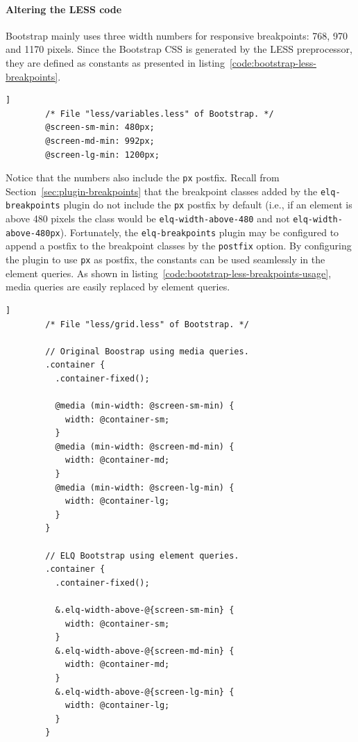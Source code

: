 \documentclass[a4paper,11pt]{kth-mag}
\newcommand{\code}[1]{\texttt{#1}}
\begin{document}
      \paragraph{Altering the LESS code}
      Bootstrap mainly uses three width numbers for responsive breakpoints: 768, 970 and 1170 pixels.
      Since the Bootstrap \gls{CSS} is generated by the \gls{LESS} preprocessor, they are defined as constants as presented in listing~\ref{code:bootstrap-less-breakpoints}.
      \begin{lstlisting}[gobble=8,label={code:bootstrap-less-breakpoints},caption={The main breakpoints used by Bootstrap defined as \gls{LESS} constants.},captionpos=b]]
        /* File "less/variables.less" of Bootstrap. */
        @screen-sm-min: 480px;
        @screen-md-min: 992px;
        @screen-lg-min: 1200px;
      \end{lstlisting}
      Notice that the numbers also include the \code{px} postfix.
      Recall from Section~\ref{sec:plugin-breakpoints} that the breakpoint classes added by the \code{elq-breakpoints} plugin do not include the \code{px} postfix by default (i.e., if an element is above 480 pixels the class would be \code{elq-width-above-480} and not \code{elq-width-above-480px}).
      Fortunately, the \code{elq-breakpoints} plugin may be configured to append a postfix to the breakpoint classes by the \code{postfix} option.
      By configuring the plugin to use \code{px} as postfix, the constants can be used seamlessly in the element queries.
      As shown in listing~\ref{code:bootstrap-less-breakpoints-usage}, media queries are easily replaced by element queries.
      \begin{lstlisting}[gobble=8,label={code:bootstrap-less-breakpoints-usage},caption={Media queries can easily be replaced with element queries. By using the \code{elq-breakpoints} postfix option, the breakpoint constants can be used directly in the selectors.},captionpos=b]]
        /* File "less/grid.less" of Bootstrap. */

        // Original Boostrap using media queries.
        .container {
          .container-fixed();

          @media (min-width: @screen-sm-min) {
            width: @container-sm;
          }
          @media (min-width: @screen-md-min) {
            width: @container-md;
          }
          @media (min-width: @screen-lg-min) {
            width: @container-lg;
          }
        }

        // ELQ Bootstrap using element queries.
        .container {
          .container-fixed();

          &.elq-width-above-@{screen-sm-min} {
            width: @container-sm;
          }
          &.elq-width-above-@{screen-md-min} {
            width: @container-md;
          }
          &.elq-width-above-@{screen-lg-min} {
            width: @container-lg;
          }
        }
      \end{lstlisting}
\end{document}
